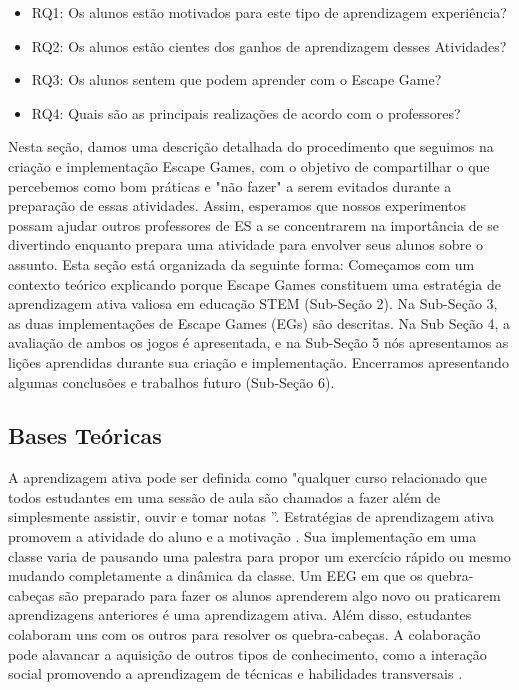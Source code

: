 \begin{itemize}
    \item RQ1: Os alunos estão motivados para este tipo de aprendizagem experiência?
    \item RQ2: Os alunos estão cientes dos ganhos de aprendizagem desses Atividades?
    \item RQ3: Os alunos sentem que podem aprender com o Escape Game?
    \item RQ4: Quais são as principais realizações de acordo com o professores?
\end{itemize}

Nesta seção, damos uma descrição detalhada do procedimento que seguimos na criação e implementação Escape Games, com o objetivo de compartilhar o que percebemos como bom práticas e "não fazer" a serem evitados durante a preparação de essas atividades. Assim, esperamos que nossos experimentos possam ajudar outros professores de ES a se concentrarem na importância de se divertindo enquanto prepara uma atividade para envolver seus alunos sobre o assunto. Esta seção está organizada da seguinte forma: Começamos com um contexto teórico explicando porque Escape Games constituem uma estratégia de aprendizagem ativa valiosa em educação STEM (Sub-Seção 2). Na Sub-Seção 3, as duas implementações de Escape Games (EGs) são descritas. Na Sub Seção 4, a avaliação de ambos os jogos é apresentada, e na Sub-Seção 5 nós apresentamos as lições aprendidas durante sua criação e implementação. Encerramos apresentando algumas conclusões e trabalhos futuro (Sub-Seção 6).

\subsection{Bases Teóricas}

A aprendizagem ativa pode ser definida como "qualquer curso relacionado que todos estudantes em uma sessão de aula são chamados a fazer além de simplesmente assistir, ouvir e tomar notas ”\citep{felder_active_2009}. Estratégias de aprendizagem ativa promovem a atividade do aluno e a motivação \citep{prince_does_2004}. Sua implementação em uma classe varia de pausando uma palestra para propor um exercício rápido ou mesmo mudando completamente a dinâmica da classe. Um EEG em que os quebra-cabeças são preparado para fazer os alunos aprenderem algo novo ou praticarem aprendizagens anteriores é uma aprendizagem ativa. Além disso, estudantes  colaboram uns com os outros para resolver os quebra-cabeças. A colaboração pode alavancar a aquisição de outros tipos de conhecimento, como a interação social promovendo a aprendizagem de técnicas e habilidades transversais \citep{tadjer_improving_2020}.

